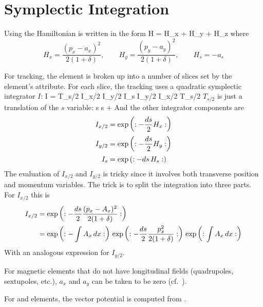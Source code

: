 \section{Symplectic Integration}
\label{s:symp.track}

Using  the Hamiltonian is written in the form
\Begineq
  H = H_x + H_y + H_z
\Endeq
where
\begin{equation}
  H_x = \frac{(p_x - a_x)^2}{2 (1 + \delta)}, \qquad
  H_y = \frac{(p_y - a_y)^2}{2 (1 + \delta)}, \qquad
  H_s = - a_s 
\end{equation}

For tracking, the element is broken up into a number of slices set by
the element's  attribute. For each slice, the tracking
uses a quadratic symplectic integrator $I$:
\Begineq
  I = T_{s/2} \; I_{x/2} \; I_{y/2} \; I_s \; I_{y/2} \; I_{x/2} \; T_{s/2}
\Endeq
$T_{s/2}$ is just a translation of the $s$ variable:
\Begineq
  s \rightarrow s + 
\Endeq
And the other integrator components are
\begin{align}
  I_{x/2} &= \exp \left( : -\frac{ds}{2} H_x : \right) \nonumber \\
  I_{y/2} &= \exp \left( : -\frac{ds}{2} H_y : \right) \\
  I_{s}   &= \exp \left( : -ds \, H_s : \right) \nonumber
\end{align}
The evaluation of $I_{x/2}$ and $I_{y/2}$ is tricky since it involves both transverse
position and momentum variables. The trick is to split the integration into three parts.
For $I_{x/2}$ this is
\begin{align}
  I_{x/2} &= \exp \left( : -\frac{ds}{2} \frac{(p_x - A_x)^2}{2 (1 + \delta)} : \right) \nonumber \\
  &= \exp \left( : -\int A_x \, dx : \right) \,
     \exp \left( : -\frac{ds}{2} \frac{p_x^2}{2 (1 + \delta)} : \right) \,
     \exp \left( : \int A_x \, dx : \right)
  \label{ids2}
\end{align}
With an analogous expression for $I_{y/2}$.

For magnetic elements that do not have longitudinal fields
(quadrupoles, sextupoles, etc.), $a_x$ and $a_y$ can be taken to be
zero (cf.~).

For  and  elements, the vector potential is computed from
.

